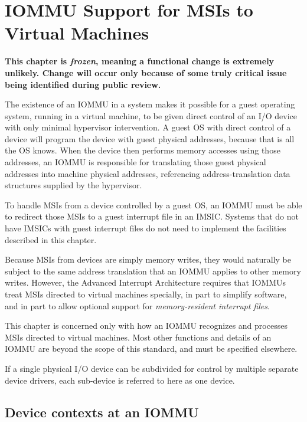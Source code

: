 
\chapter{IOMMU Support for MSIs to Virtual Machines}
\label{ch:IOMMU}

\textbf{%
This chapter is \emph{frozen}, meaning
a functional change is extremely unlikely.
Change will occur only because of some truly critical issue
being identified during public review.%
}
\bigskip

The existence of an \mbox{IOMMU} in a system makes it possible for a guest
operating system, running in a virtual machine, to be given direct
control of an I/O device with only minimal hypervisor intervention.
A guest OS with direct control of a device will program the device with
guest physical addresses, because that is all the OS knows.
When the device then performs memory accesses using those addresses, an
\mbox{IOMMU} is responsible for translating those guest physical addresses
into machine physical addresses, referencing address-translation data
structures supplied by the hypervisor.

To handle MSIs from a device controlled by a guest OS, an \mbox{IOMMU} must
be able to redirect those MSIs to a guest interrupt file in an IMSIC.
Systems that do not have IMSICs with guest interrupt files do not need
to implement the facilities described in this chapter.

Because MSIs from devices are simply memory writes, they would
naturally be subject to the same address translation that an \mbox{IOMMU}
applies to other memory writes.
However, the Advanced Interrupt Architecture requires that \mbox{IOMMU}s
treat MSIs directed to virtual machines specially, in part to
simplify software, and in part to allow optional support for
\emph{memory-resident interrupt files}.

This chapter is concerned only with how an \mbox{IOMMU} recognizes and
processes MSIs directed to virtual machines.
Most other functions and details of an \mbox{IOMMU} are beyond the scope of
this standard, and must be specified elsewhere.

If a single physical I/O device can be subdivided for
control by multiple separate device drivers,
each sub-device is referred to here as one device.

\section{Device contexts at an IOMMU}
\label{sec:IOMMU-deviceContexts}

